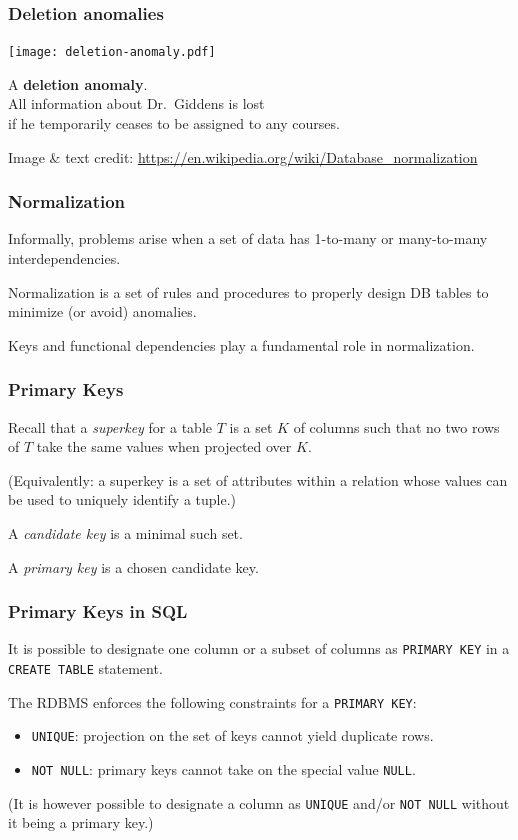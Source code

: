 \documentclass[english,serif,mathserif]{beamer}
\begin{document}
\begin{frame}
  \frametitle{Deletion anomalies}
  \begin{center}
    \texttt{[image: deletion-anomaly.pdf]}

    \+ A \textbf{deletion anomaly}. \\ All information about Dr.~Giddens is lost \\ if
    he temporarily ceases to be assigned to any courses.

    \+
    {\tiny
      Image \& text credit: \url{https://en.wikipedia.org/wiki/Database_normalization}}
  \end{center}
\end{frame}


\begin{frame}
  \frametitle{Normalization}
  Informally, problems arise when a set of data has 1-to-many or
  many-to-many interdependencies.

  \+ Normalization is a set of rules and procedures to properly design DB tables
  to minimize (or avoid) anomalies.

  \+
  Keys and functional dependencies play a fundamental role in normalization.
\end{frame}


\begin{frame}
  \frametitle{Primary Keys}

  Recall that a \emph{superkey} for a table $T$ is a set $K$ of columns such
  that no two rows of $T$ take the same values when projected over $K$.

  \+ (Equivalently: a superkey is a set of attributes within a relation whose
  values can be used to uniquely identify a tuple.)

  \+
  A \emph{candidate key} is a minimal such set.

  \+
  A \emph{primary key} is a chosen candidate key.
\end{frame}


\begin{frame}
  \frametitle{Primary Keys in SQL}

  It is possible to designate one column or a subset of columns as
  \texttt{PRIMARY KEY} in a \texttt{CREATE TABLE} statement.

  \+
  The RDBMS enforces the following constraints for a \texttt{PRIMARY KEY}:
  \begin{itemize}
  \item \texttt{UNIQUE}: projection on the set of keys cannot yield duplicate rows.
  \item \texttt{NOT NULL}: primary keys cannot take on the special value \texttt{NULL}.
  \end{itemize}

  \+ (It is however possible to designate a column as \texttt{UNIQUE} and/or
  \texttt{NOT NULL} without it being a primary key.)
\end{frame}
\end{document}
